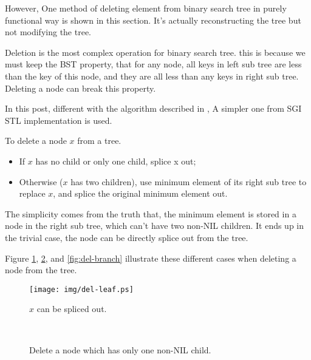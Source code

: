 \documentclass{article}
\begin{document}
However, One method of deleting element from binary search
tree in purely functional way is shown in this section. It's actually
reconstructing the tree but not modifying the tree.

Deletion is the most complex operation for binary search tree.
this is because we must keep the BST property, that for any node,
all keys in left sub tree are less than the key of this node, and
they are all less than any keys in right sub tree. Deleting a node
can break this property.

In this post, different with the algorithm described in \cite{CLRS},
A simpler one from SGI STL implementation is used.\cite{sgi-stl}

To delete a node $x$ from a tree.
\begin{itemize}
\item If $x$ has no child or only one child, splice x out;
\item Otherwise ($x$ has two children), use minimum element of its right sub tree to replace $x$, and splice the original minimum element out.
\end{itemize}

The simplicity comes from the truth that, the minimum element is stored
in a node in the right sub tree, which can't have two non-NIL children.
It ends up in the trivial case, the node can be directly splice
out from the tree.

Figure \ref{fig:del-leaf}, \ref{fig:del-1child}, and \ref{fig:del-branch}
illustrate these different cases when deleting a node from the tree.

\begin{figure}[htbp]
  \centering
  \texttt{[image: img/del-leaf.ps]}
  \caption{$x$ can be spliced out.} \label{fig:del-leaf}
\end{figure}

\begin{figure}[htbp]
  \centering
   \\
  \caption{Delete a node which has only one non-NIL child.}
  \label{fig:del-1child}
\end{figure}
\end{document}
